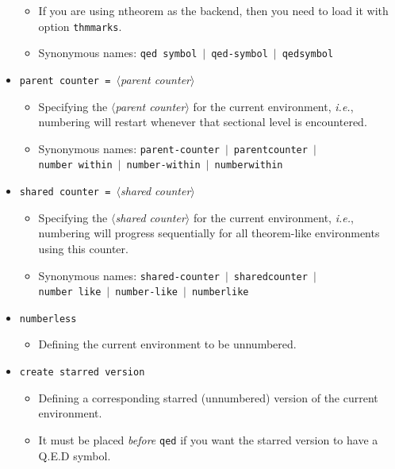 \documentclass[classical]{einfart}
\newcommand{\meta}[1]{$\langle${\normalfont\itshape#1}$\rangle$}
\newcommand{\packageoption}[1]{\textcolor{code-option}{\texttt{#1}}}
\newcommand{\commandoption}[1]{\textcolor{code-keys}{\texttt{#1}}}
\begin{document}
\begin{itemize}[label=,leftmargin=1.25em,itemindent=-1.25em]
\begin{itemize}
            \item If you are using \textsf{ntheorem} as the backend, then you need to load it with option \packageoption{thmmarks}.
            \item Synonymous names: \commandoption{qed symbol} \,$|$\, \commandoption{qed-symbol} \,$|$\, \commandoption{qedsymbol}
        \end{itemize}
\pagebreak
    \item \commandoption{parent counter}\lstinline| = |\meta{parent counter}
        \begin{itemize}
            \item Specifying the \meta{parent counter} for the current environment, \emph{i.e.}, numbering will restart whenever that sectional level is encountered.
            \item Synonymous names: \commandoption{parent-counter} \,$|$\, \commandoption{parentcounter} \,$|$\, \\\phantom{Synonymous names: }\commandoption{number within} \,$|$\, \commandoption{number-within} \,$|$\, \commandoption{numberwithin}
        \end{itemize}
    \item \commandoption{shared counter}\lstinline| = |\meta{shared counter}
        \begin{itemize}
            \item Specifying the \meta{shared counter} for the current environment, \emph{i.e.}, numbering will progress sequentially for all theorem-like environments using this counter.
            \item Synonymous names: \commandoption{shared-counter} \,$|$\, \commandoption{sharedcounter} \,$|$\, \\\phantom{Synonymous names: }\commandoption{number like} \,$|$\, \commandoption{number-like} \,$|$\, \commandoption{numberlike}
        \end{itemize}
    \item \commandoption{numberless}
        \begin{itemize}
            \item Defining the current environment to be unnumbered.
        \end{itemize}
    \item \commandoption{create starred version}
        \begin{itemize}
            \item Defining a corresponding starred (unnumbered) version of the current environment.
            \item It must be placed \emph{before} \commandoption{qed} if you want the starred version to have a Q.E.D symbol.

\end{itemize}
\end{itemize}
\end{document}

